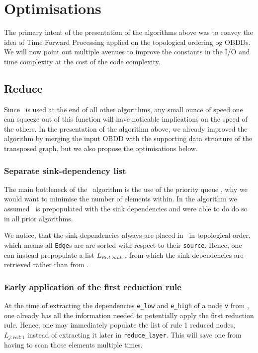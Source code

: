 \section{Optimisations} \label{sec:optimisations}
The primary intent of the presentation of the algorithms above was to convey the
idea of Time Forward Processing applied on the topological ordering og OBDDs. We
will now point out multiple avenues to improve the constants in the I/O and time
complexity at the cost of the code complexity.

\subsection{Reduce}
Since \Reduce\ is used at the end of all other algorithms, any small ounce of
speed one can squeeze out of this function will have noticable implications on
the speed of the others. In the presentation of the algorithm above, we already
improved the algorithm by merging the input OBDD with the supporting data
structure of the transposed graph, but we also propose the optimisations below.

\subsubsection{Separate sink-dependency list}
The main bottleneck of the \Reduce\ algorithm is the use of the priority queue
\ReduceQdep, why we would want to minimise the number of elements within. In the
algorithm we assumed \ReduceQdep\ is prepopulated with the sink dependencies and
were able to do do so in all prior algorithms.

We notice, that the sink-dependencies always are placed in \ReduceQdep\ in
topological order, which means all \lstinline{Edge}s are are sorted with respect
to their \lstinline{source}. Hence, one can instead prepopulate a list
$L_{\mathit{Red:}Sinks}$, from which the sink dependencies are retrieved rather
than from \ReduceQdep.


\subsubsection{Early application of the first reduction rule}
At the time of extracting the dependencies \lstinline{e_low} and
\lstinline{e_high} of a node \lstinline{v} from \ReduceQdep, one already has all
the information needed to potentially apply the first reduction rule. Hence, one
may immediately populate the list of rule 1 reduced nodes,
$L_{j:\mathit{red}:1}$ instead of extracting it later in
\lstinline{reduce_layer}. This will save one from having to scan those elements
multiple times.


